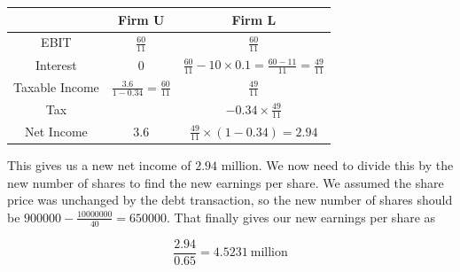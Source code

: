 \documentclass[12pt, letterpaper, parskip = full]{article}
\begin{document}
	    \begin{tabular}{|c|c|c|}
        \hline
        \hline 
        & Firm U & Firm L \\
         \hline
         \hline
         EBIT & \(\frac{60}{11}\) & \(\frac{60}{11}\) \\
         \hline
         Interest & \(0\) & \(\frac{60}{11} - 10 \times 0.1 = \frac{60 - 11}{11} = \frac{49}{11}\) \\
         \hline
         \hline
         Taxable Income & \(\frac{3.6}{1 - 0.34} = \frac{60}{11}\) & \(\frac{49}{11}\) \\
         \hline
         Tax & & \(-0.34 \times \frac{49}{11}\) \\
         \hline
         \hline
         Net Income & \(3.6\) & \(\frac{49}{11} \times (1 - 0.34) = 2.94\) \\
         \hline
         \hline
    \end{tabular}

	This gives us a new net income of \(2.94\) million. We now need to divide this by the new number of shares to find the new earnings per share. We assumed the share price was unchanged by the debt transaction, so the new number of shares should be \(900000 - \frac{10000000}{40} = 650000\). That finally gives our new earnings per share as

	\[ \frac{2.94}{0.65} = 4.5231\ \text{million}    \]
\end{document}
